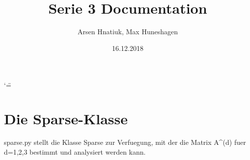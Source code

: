 \documentclass[letterpaper,10pt,ngerman]{sphinxmanual}
\title{Serie 3 Documentation}
\date{16.12.2018}
\author{Arsen Hnatiuk, Max Huneshagen}
\begin{document}
\ifnum\catcode`\"=\active{}\fi
\maketitle
\sphinxtableofcontents
{}\label{\detokenize{index::doc}}



\chapter{Die Sparse-Klasse}
\label{\detokenize{index:welcome-to-serie-3-s-documentation}}\label{\detokenize{index:module-sparse_erw}}\label{\detokenize{index:die-sparse-klasse}}
sparse.py stellt die Klasse Sparse zur Verfuegung, mit der die Matrix A\textasciicircum{}(d) fuer d=1,2,3
bestimmt und analysiert werden kann.
\end{document}
